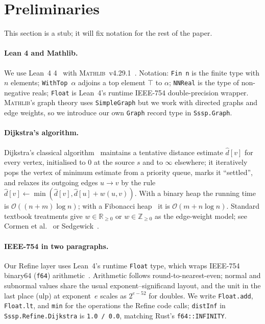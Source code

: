 \documentclass[11pt,a4paper]{article}
\newcommand{\Lean}{Lean~4\xspace}
\newcommand{\Mathlib}{\textsc{Mathlib}\xspace}
\newcommand{\Dijkstra}{Dijkstra\xspace}
\newcommand{\Bigo}{\mathcal{O}}
\newcommand{\dhat}{\hat{d}}
\newcommand{\code}[1]{\texttt{#1}}
\theoremstyle{plain}
\theoremstyle{definition}
\begin{document}
\section{Preliminaries}\label{sec:prelim}

This section is a stub; it will fix notation for the rest of the paper.

\paragraph*{Lean 4 and Mathlib.}
We use \Lean{} 4~\cite{deMouraUllrich2021Lean4} with
\Mathlib{}~v4.29.1~\cite{Mathlib2020}. Notation: \code{Fin n} is the finite
type with $n$ elements; \code{WithTop $\alpha$} adjoins a top element
$\top$ to $\alpha$; \code{NNReal} is the type of non-negative reals;
\code{Float} is \Lean's runtime IEEE-754 double-precision wrapper.
\Mathlib's graph theory uses \code{SimpleGraph} but we work with directed
graphs and edge weights, so we introduce our own \code{Graph} record type
in \code{Sssp.Graph}.

\paragraph*{\Dijkstra's algorithm.}
Dijkstra's classical algorithm~\cite{Dijkstra1959} maintains a tentative
distance estimate $\dhat[v]$ for every vertex, initialised to $0$ at the
source $s$ and to $\infty$ elsewhere; it iteratively pops the vertex of
minimum estimate from a priority queue, marks it ``settled'', and relaxes
its outgoing edges $u \to v$ by the rule
$\dhat[v] \leftarrow \min(\dhat[v], \dhat[u] + w(u,v))$. With a binary heap
the running time is $\Bigo((n+m)\log n)$; with a Fibonacci
heap~\cite{FredmanTarjan1987} it is $\Bigo(m + n\log n)$. Standard
textbook treatments give $w \in \mathbb{R}_{\geq 0}$ or
$w \in \mathbb{Z}_{\geq 0}$ as the edge-weight model;
see Cormen et al.~\cite{CLRS2022} or
Sedgewick~\cite{Sedgewick2003GraphAlgorithms}.

\paragraph*{IEEE-754 in two paragraphs.}
Our Refine layer uses \Lean's runtime \code{Float} type, which wraps
IEEE-754 binary64 (\code{f64}) arithmetic~\cite{IEEE754_2019,LeanFloat}.
Arithmetic follows round-to-nearest-even; normal and subnormal values share
the usual exponent--significand layout, and the unit in the last place
(ulp) at exponent~$e$ scales as $2^{e-52}$ for doubles.
We write \code{Float.add}, \code{Float.lt}, and \code{min} for the
operations the Refine code calls; \code{distInf} in
\code{Sssp.Refine.Dijkstra} is \code{1.0 / 0.0}, matching Rust's
\code{f64::INFINITY}.
\end{document}
